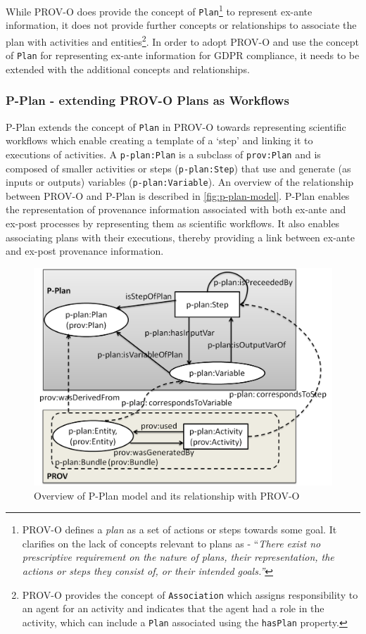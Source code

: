 While PROV-O does provide the concept of \texttt{Plan}\footnote{PROV-O defines a \textit{plan} as a set of actions or steps towards some goal. It clarifies on the lack of concepts relevant to plans as - ``\textit{There exist no prescriptive requirement on the nature of plans, their representation, the actions or steps they consist of, or their intended goals.''}} to represent ex-ante information, it does not provide further concepts or relationships to associate the plan with activities and entities\footnote{PROV-O provides the concept of \texttt{Association} which assigns responsibility to an agent for an activity and indicates that the agent had a role in the activity, which can include a \texttt{Plan} associated using the \texttt{hasPlan} property.}.
In order to adopt PROV-O and use the concept of \texttt{Plan} for representing ex-ante information for GDPR compliance, it needs to be extended with the additional concepts and relationships.

\subsubsection{P-Plan - extending PROV-O Plans as Workflows}
P-Plan \cite{garijo_p-plan_2014} extends the concept of \texttt{Plan} in PROV-O towards representing scientific
workflows which enable creating a template of a `step' and linking it to executions of activities.
A \texttt{p-plan:Plan} is a subclass of \texttt{prov:Plan} and is composed of smaller activities or steps (\texttt{p-plan:Step}) that use and generate (as inputs or outputs) variables (\texttt{p-plan:Variable}).
An overview of the relationship between PROV-O and P-Plan is described in \autoref{fig:p-plan-model}.
P-Plan enables the representation of provenance information associated with both ex-ante and ex-post processes by representing them as scientific workflows. It also enables associating plans with their executions, thereby providing a link between ex-ante and ex-post provenance information.
\begin{figure}[htbp]
    \centering
    \includegraphics[width=0.75\linewidth]{img/p-plan-model.png}
    \caption{Overview of P-Plan model and its relationship with PROV-O \cite{garijo_p-plan_2014}}
    \label{fig:p-plan-model}
\end{figure}

